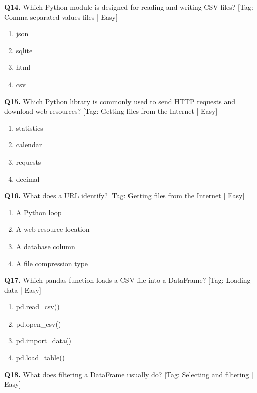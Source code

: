 \vspace{2mm}
\noindent\textbf{Q14.} Which Python module is designed for reading and writing CSV files? \hfill [Tag: Comma-separated values files | Easy]
\begin{enumerate}[label=(\alph*),topsep=2pt,itemsep=1pt,partopsep=0pt,parsep=0pt]
    \item {json}
    \item {sqlite}
    \item {html}
    \item {csv}
\end{enumerate}
\vspace{2mm}
\noindent\textbf{Q15.} Which Python library is commonly used to send HTTP requests and download web resources? \hfill [Tag: Getting files from the Internet | Easy]
\begin{enumerate}[label=(\alph*),topsep=2pt,itemsep=1pt,partopsep=0pt,parsep=0pt]
    \item {statistics}
    \item {calendar}
    \item {requests}
    \item {decimal}
\end{enumerate}
\vspace{2mm}
\noindent\textbf{Q16.} What does a URL identify? \hfill [Tag: Getting files from the Internet | Easy]
\begin{enumerate}[label=(\alph*),topsep=2pt,itemsep=1pt,partopsep=0pt,parsep=0pt]
    \item {A Python loop}
    \item {A web resource location}
    \item {A database column}
    \item {A file compression type}
\end{enumerate}
\vspace{2mm}
\noindent\textbf{Q17.} Which pandas function loads a CSV file into a DataFrame? \hfill [Tag: Loading data | Easy]
\begin{enumerate}[label=(\alph*),topsep=2pt,itemsep=1pt,partopsep=0pt,parsep=0pt]
    \item {pd.read\_csv()}
    \item {pd.open\_csv()}
    \item {pd.import\_data()}
    \item {pd.load\_table()}
\end{enumerate}
\vspace{2mm}
\noindent\textbf{Q18.} What does filtering a DataFrame usually do? \hfill [Tag: Selecting and filtering | Easy]
